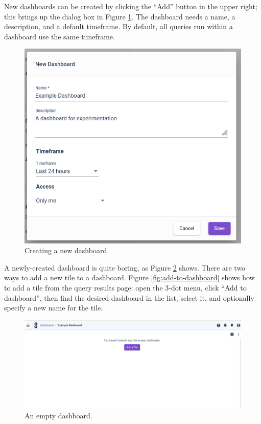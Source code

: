 New dashboards can be created by clicking the ``Add'' button in the upper right; this brings up the dialog box in Figure \ref{fig:dashboard-add}. The dashboard needs a name, a description, and a default timeframe. By default, all queries run within a dashboard use the same timeframe.

\begin{figure}
	\includegraphics[width=0.6\linewidth]{images/dashboard-add.png}
	\caption{Creating a new dashboard.}
	\label{fig:dashboard-add}
\end{figure}

A newly-created dashboard is quite boring, as Figure \ref{fig:dashboard-blank} shows. There are two ways to add a new tile to a dashboard. Figure \ref{fig:add-to-dashboard} shows how to add a tile from the query results page: open the 3-dot menu, click ``Add to dashboard'', then find the desired dashboard in the list, select it, and optionally specify a new name for the tile.

\begin{figure}
	\includegraphics[width=0.8\linewidth]{images/dashboard-blank.png}
	\caption{An empty dashboard.}
	\label{fig:dashboard-blank}
\end{figure}

